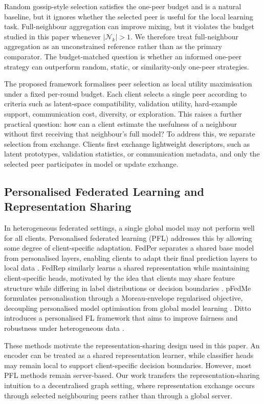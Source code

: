 \documentclass[conference]{IEEEtran}
\begin{document}
Random gossip-style selection satisfies the one-peer budget and is a natural baseline, but it ignores whether the selected peer is useful for the local learning task. Full-neighbour aggregation can improve mixing, but it violates the budget studied in this paper whenever $|\mathcal{N}_k|>1$. We therefore treat full-neighbour aggregation as an unconstrained reference rather than as the primary comparator. The budget-matched question is whether an informed one-peer strategy can outperform random, static, or similarity-only one-peer strategies.

The proposed framework formalises peer selection as local utility maximisation under a fixed per-round budget. Each client selects a single peer according to criteria such as latent-space compatibility, validation utility, hard-example support, communication cost, diversity, or exploration. This raises a further practical question: how can a client estimate the usefulness of a neighbour without first receiving that neighbour's full model? To address this, we separate selection from exchange. Clients first exchange lightweight descriptors, such as latent prototypes, validation statistics, or communication metadata, and only the selected peer participates in model or update exchange.

\subsection{Personalised Federated Learning and Representation Sharing}
\label{subsec:personalised-federated-learning-and-representation}
In heterogeneous federated settings, a single global model may not perform well for all clients. Personalised federated learning (PFL) addresses this by allowing some degree of client-specific adaptation. FedPer separates a shared base model from personalised layers, enabling clients to adapt their final prediction layers to local data \cite{arivazhagan2019fedper}. FedRep similarly learns a shared representation while maintaining client-specific heads, motivated by the idea that clients may share feature structure while differing in label distributions or decision boundaries \cite{collins2021exploiting}. pFedMe formulates personalisation through a Moreau-envelope regularised objective, decoupling personalised model optimisation from global model learning \cite{dinh2020pfedme}. Ditto introduces a personalised FL framework that aims to improve fairness and robustness under heterogeneous data \cite{li2021ditto}.

These methods motivate the representation-sharing design used in this paper. An encoder can be treated as a shared representation learner, while classifier heads may remain local to support client-specific decision boundaries. However, most PFL methods remain server-based. Our work transfers the representation-sharing intuition to a decentralised graph setting, where representation exchange occurs through selected neighbouring peers rather than through a global server.
\end{document}
